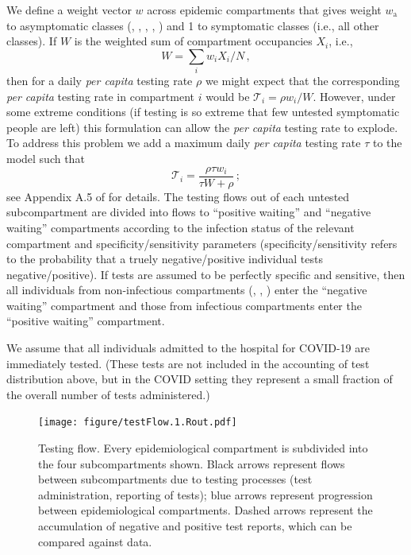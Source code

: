 \documentclass[12pt]{article}\usepackage[]{graphicx}\usepackage[]{color}
\begin{document}
We define a weight vector $w$ across epidemic compartments that gives weight $w_\textrm{a}$ to asymptomatic classes (, , , , ) and 1 to symptomatic classes (i.e., all other classes).
If $W$ is the weighted sum of compartment occupancies $X_i$, i.e., 
\begin{equation}
W = \sum_i w_i X_i/N \,,
\end{equation}
then for a daily \emph{per capita} testing rate $\rho$ we might expect that the corresponding \emph{per capita} testing rate in compartment $i$ would be ${\mathcal T}_i = \rho w_i/W$. 
However, under some extreme conditions (if testing is so extreme that few untested symptomatic people are left) this formulation can allow the \emph{per capita} testing rate to explode. To address this problem we add a maximum daily \emph{per capita} testing rate $\tau$ to the model such that
\begin{equation}
{\mathcal T}_i = \frac{\rho \tau w_i}{\tau W + \rho} \,;
\end{equation}
see Appendix A.5 of \cite{Ghar+22} for details.  The testing flows out of each untested subcompartment are divided into flows to ``positive waiting'' and ``negative waiting'' compartments according to the infection status of the relevant compartment and specificity/sensitivity parameters (specificity/sensitivity refers to the probability that a truely negative/positive individual tests negative/positive).   If tests are assumed to be perfectly specific and sensitive, then all individuals from non-infectious compartments (, , ) enter the ``negative waiting'' compartment and those from infectious compartments enter the ``positive waiting'' compartment.

We assume that all individuals admitted to the hospital for COVID-19 are immediately tested. (These tests are not included in the accounting of test distribution above, but in the COVID setting they represent a small fraction of the overall number of tests administered.)

\begin{figure}
  \texttt{[image: figure/testFlow.1.Rout.pdf]}
  \caption{Testing flow. Every epidemiological compartment is subdivided into the four subcompartments shown.
    Black arrows represent flows between subcompartments due to testing processes (test administration, reporting of tests); blue arrows represent progression between epidemiological compartments.
    Dashed arrows represent the accumulation of negative and positive test reports, which can be compared against data.}
  \label{fig:testing_flow}
\end{figure}
\end{document}
